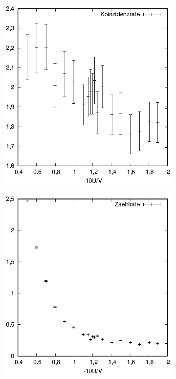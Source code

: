 \begin{figure}[h]
  \centering
  \begin{subfigure}[h]{0.5\textwidth}
    \centering
    \includegraphics[width=\textwidth]{data/schwelle_1_koinzidenz.eps}
  \end{subfigure}%
  \begin{subfigure}[h]{0.5\textwidth}
    \centering
    \includegraphics[width=\textwidth]{data/schwelle_1_zaehler.eps}

\end{subfigure}
\end{figure}
